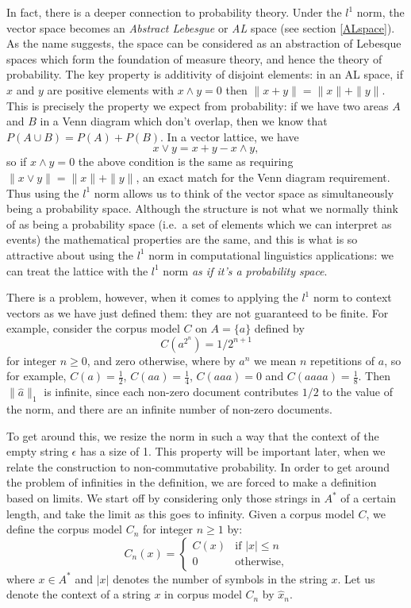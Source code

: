 \documentclass[11pt]{report}
\begin{document}
In fact, there is a deeper connection to probability theory. Under the $l^1$ norm, the vector space becomes an \emph{Abstract Lebesgue} or \emph{AL} space (see section \ref{ALspace}). As the name suggests, the space can be considered as an abstraction of Lebesque spaces which form the foundation of measure theory, and hence the theory of probability. The key property is additivity of disjoint elements: in an AL space, if $x$ and $y$ are positive elements with $x \land y = 0$ then $\|x + y\| = \|x\| + \|y\|$. This is precisely the property we expect from probability: if we have two areas $A$ and $B$ in a Venn diagram which don't overlap, then we know that $P(A\cup B) = P(A) + P(B)$. In a vector lattice, we have
$$x \lor y = x + y - x \land y,$$
so if $x\land y = 0$ the above condition is the same as requiring $\|x \lor y\| = \|x\| + \|y\|$, an exact match for the Venn diagram requirement. Thus using the $l^1$ norm allows us to think of the vector space as simultaneously being a probability space. Although the structure is not what we normally think of as being a probability space (i.e.~a set of elements which we can interpret as events) the mathematical properties are the same, and this is what is so attractive about using the $l^1$ norm in computational linguistics applications: we can treat the lattice with the $l^1$ norm \emph{as if it's a probability space}.

There is a problem, however, when it comes to applying the $l^1$ norm to context vectors as we have just defined them: they are not guaranteed to be finite. For example, consider the corpus model $C$ on $A = \{a\}$ defined by
$$C(a^{2^n}) = 1/2^{n+1}$$
for integer $n \ge 0$, and zero otherwise, where by $a^n$ we mean $n$ repetitions of $a$, so for example, $C(a) = \frac{1}{2}$, $C(aa) = \frac{1}{4}$, $C(aaa) = 0$ and $C(aaaa) = \frac{1}{8}$. Then $\|\hat{a}\|_1$ is infinite, since each non-zero document contributes $1/2$ to the value of the norm, and there are an infinite number of non-zero documents.

To get around this, we resize the norm in such a way that the context of the empty string $\epsilon$ has a size of 1. This property will be important later, when we relate the construction to non-commutative probability. In order to get around the problem of infinities in the definition, we are forced to make a definition based on limits. We start off by considering only those strings in $A^*$ of a certain length, and take the limit as this goes to infinity. Given a corpus model $C$, we define the corpus model $C_n$ for integer $n \ge 1$ by:
$$C_n(x) = \begin{cases}
C(x) & \text{if $|x| \le n$}\\
0 & \text{otherwise,}
\end{cases}$$
where $x\in A^*$ and $|x|$ denotes the number of symbols in the string $x$. Let us denote the context of a string $x$ in corpus model $C_n$ by $\hat{x}_n$.
\end{document}
